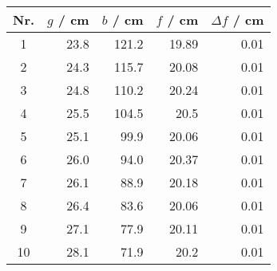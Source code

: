 \begin{tabular}{c|rrrr}
Nr. & $g$ / cm & $b$ / cm & $f$ / cm & $\Delta f$ / cm \\
\hline
1 & 23.8 & 121.2 & 19.89 & 0.01\\
2 & 24.3 & 115.7 & 20.08 & 0.01\\
3 & 24.8 & 110.2 & 20.24 & 0.01\\
4 & 25.5 & 104.5 & 20.5 & 0.01\\
5 & 25.1 & 99.9 & 20.06 & 0.01\\
6 & 26.0 & 94.0 & 20.37 & 0.01\\
7 & 26.1 & 88.9 & 20.18 & 0.01\\
8 & 26.4 & 83.6 & 20.06 & 0.01\\
9 & 27.1 & 77.9 & 20.11 & 0.01\\
10 & 28.1 & 71.9 & 20.2 & 0.01
\end{tabular}
